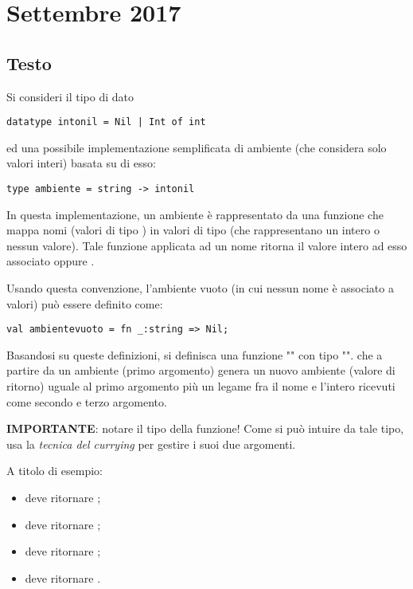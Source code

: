 \section{Settembre 2017}

\subsection{Testo}

Si consideri il tipo di dato

\begin{lstlisting}
datatype intonil = Nil | Int of int
\end{lstlisting}

ed una possibile implementazione semplificata di ambiente (che considera solo valori interi) basata su di esso:

\begin{lstlisting}
type ambiente = string -> intonil
\end{lstlisting}

In questa implementazione, un ambiente è rappresentato da una funzione che mappa nomi (valori di tipo ) in valori di tipo  (che rappresentano un intero o nessun valore). Tale funzione applicata ad un nome ritorna il valore intero ad esso associato oppure .

\medskip
Usando questa convenzione, l'ambiente vuoto (in cui nessun nome è associato a valori) può essere definito come:

\begin{lstlisting}
val ambientevuoto = fn _:string => Nil;
\end{lstlisting}

Basandosi su queste definizioni, si definisca una funzione "" con tipo "". che a partire da un ambiente (primo argomento) genera un nuovo ambiente (valore di ritorno) uguale al primo argomento più un legame fra il nome e l'intero ricevuti come secondo e terzo argomento.

\medskip
\textbf{IMPORTANTE}: notare il tipo della funzione! Come si può intuire da tale tipo, usa la \emph{tecnica del currying} per gestire i suoi due argomenti.

\medskip
A titolo di esempio:

\begin{itemize}
  \item {} deve ritornare ;
  \item {} deve ritornare ;
  \item {} deve ritornare ;
  \item {} deve ritornare .
\end{itemize}

